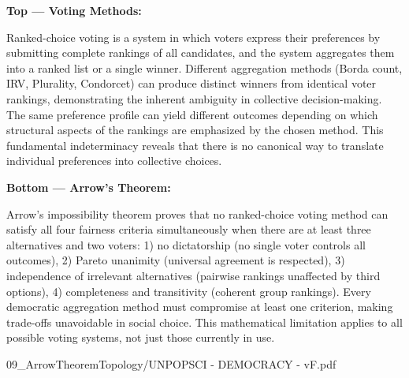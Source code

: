 \begin{SideNotePage}{
  \textbf{Top — Voting Methods:} \par Ranked-choice voting is a system in which voters express their preferences by submitting complete rankings of all candidates, and the system aggregates them into a ranked list or a single winner. Different aggregation methods (Borda count, IRV, Plurality, Condorcet) can produce distinct winners from identical voter rankings, demonstrating the inherent ambiguity in collective decision-making. The same preference profile can yield different outcomes depending on which structural aspects of the rankings are emphasized by the chosen method. This fundamental indeterminacy reveals that there is no canonical way to translate individual preferences into collective choices.

  \vspace{1.5em}
  \textbf{Bottom — Arrow's Theorem:} \par Arrow's impossibility theorem proves that no ranked-choice voting method can satisfy all four fairness criteria simultaneously when there are at least three alternatives and two voters: 1) no dictatorship (no single voter controls all outcomes), 2) Pareto unanimity (universal agreement is respected), 3) independence of irrelevant alternatives (pairwise rankings unaffected by third options), 4) completeness and transitivity (coherent group rankings). Every democratic aggregation method must compromise at least one criterion, making trade-offs unavoidable in social choice. This mathematical limitation applies to all possible voting systems, not just those currently in use.
}{09_ArrowTheoremTopology/UNPOPSCI - DEMOCRACY - vF.pdf}
\end{SideNotePage}
